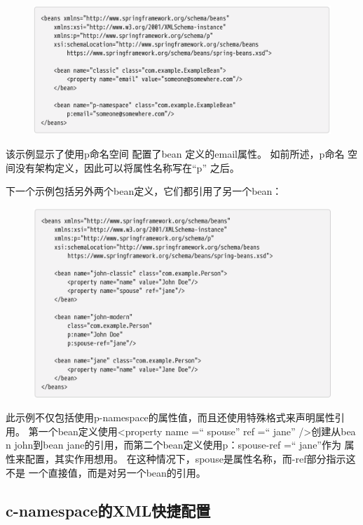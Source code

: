 \begin{figure}[ht]
    \centering
    \includegraphics[width=1\linewidth]{./Figure/IMG_code_50.png}
\end{figure}

该示例显示了使用p命名空间
配置了bean 定义的email属性。
如前所述，p命名
空间没有架构定义，因此可以将属性名称写在“p” 之后。

下一个示例包括另外两个bean定义，它们都引用了另一个bean：

\begin{figure}[ht]
    \centering
    \includegraphics[width=1\linewidth]{./Figure/IMG_code_51.png}
\end{figure}

此示例不仅包括使用p-namespace的属性值，而且还使用特殊格式来声明属性引用。 
第一个bean定义使用<property name =“ spouse” ref =“ jane” />创建从bea
n john到bean jane的引用，而第二个bean定义使用p：spouse-ref =“ jane”作为
属性来配置，其实作用想用。 在这种情况下，spouse是属性名称，而-ref部分指示这不是
一个直接值，而是对另一个bean的引用。

\subsection{c-namespace的XML快捷配置}

